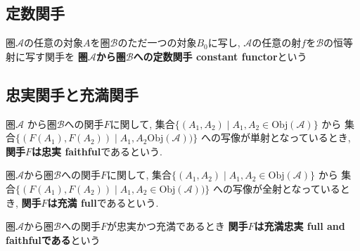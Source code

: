\subsection{定数関手}
\begin{Def}
圏$\mathscr{A}$の任意の対象$A$を圏$\mathscr{B}$のただ一つの対象$B_0$に写し,
$\mathscr{A}$の任意の射$f$を$\mathscr{B}$の恒等射に写す関手を
{\bf 圏$\mathscr{A}$から圏$\mathscr{B}$への定数関手 constant functor}という
\end{Def}

\subsection{忠実関手と充満関手}
\begin{Def}
圏$\mathscr{A}$
から圏$\mathscr{B}$への関手$F$に関して,
集合$\{(A_1,A_2)\mid A_1,A_2\in\mathrm{Obj}(\mathscr{A})\}$
から
集合$\{(F(A_1),F(A_2))\mid A_1,A_2\mathrm{Obj}(\mathscr{A}))\}$
への写像が単射となっているとき,
{\bf 関手$F$は忠実 faithful}であるという.
\end{Def}
\begin{Def}
圏$\mathscr{A}$から圏$\mathscr{B}$への関手$F$に関して,
集合$\{(A_1,A_2)\mid A_1,A_2\in\mathrm{Obj}(\mathscr{A})\}$
から
集合$\{(F(A_1),F(A_2))\mid A_1,A_2\in\mathrm{Obj}(\mathscr{A}))\}$
への写像が全射となっているとき,
{\bf 関手$F$は充満 full}であるという.
\end{Def}
\begin{Def}圏$\mathscr{A}$から圏$\mathscr{B}$への関手$F$が忠実かつ充満であるとき
{\bf 関手$F$は充満忠実 full and faithfulである}という
\end{Def}
\begin{comment}
\begin{Def}
圏$\mathscr{A}$が圏$\mathscr{A}$の部分圏であり, 関手$F:\mathscr{A}\rightarrow\mathscr{B}$が充満であるとき,
{\bf 圏$\mathscr{A}$は圏 $\mathscr{B}$の充満部分圏である}という.
\end{Def}
\end{comment}
\begin{comment}
\begin{example}
...充満忠実である.
\end{example}
\begin{example}
...忠実だが充満でない
\end{example}
\begin{example}
充満だが忠実でない
\end{example}
\begin{example}
複素数...

...

...忠実だが充満でない. （例1.30)
\end{example}
\end{comment}
